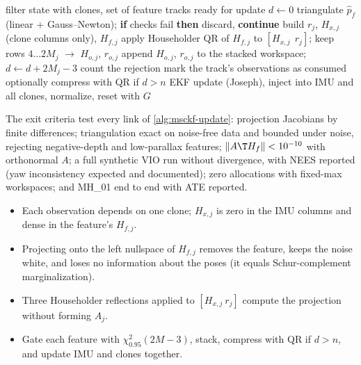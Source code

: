 \begin{algorithm}[t]
\caption{MSCKF visual update}
\label{alg:msckf-update}
\begin{algorithmic}[1]
\Require filter state with clones, set of feature tracks ready for update
\State $d \gets 0$
  \State triangulate $\hat p_f$ (linear + Gauss--Newton); \textbf{if} checks fail \textbf{then} discard, \textbf{continue}
  \State build $r_j$, $H_{x,j}$ (clone columns only), $H_{f,j}$
  \State apply Householder QR of $H_{f,j}$ to $[H_{x,j}\ \ r_j]$; keep rows $4\dots2M_j$ $\to$ $H_{o,j}$, $r_{o,j}$
    \State append $H_{o,j}$, $r_{o,j}$ to the stacked workspace; $d \gets d + 2M_j - 3$
  \Else \State count the rejection \EndIf
  \State mark the track's observations as consumed
\EndFor
{}
  \State optionally compress with QR if $d > n$
  \State EKF update (Joseph), inject into IMU and all clones, normalize, reset with $G$
\EndIf
\end{algorithmic}
\end{algorithm}

\begin{projectlink}[Milestone 10b]
The exit criteria test every link of \cref{alg:msckf-update}: projection Jacobians by finite differences; triangulation exact on
noise-free data and bounded under noise, rejecting negative-depth and low-parallax features; $\|A\T H_f\| < 10^{-10}$ with
orthonormal $A$; a full synthetic VIO run without divergence, with NEES reported (yaw inconsistency expected and documented);
zero allocations with fixed-max workspaces; and MH\_01 end to end with ATE reported.
\end{projectlink}

\begin{takeaways}
\begin{itemize}
  \item Each observation depends on one clone; $H_{x,j}$ is zero in the IMU columns and dense in the feature's $H_{f,j}$.
  \item Projecting onto the left nullspace of $H_{f,j}$ removes the feature, keeps the noise white, and loses no information about
        the poses (it equals Schur-complement marginalization).
  \item Three Householder reflections applied to $[H_{x,j}\ r_j]$ compute the projection without forming $A_j$.
  \item Gate each feature with $\chi^2_{0.95}(2M - 3)$, stack, compress with QR if $d > n$, and update IMU and clones together.
\end{itemize}
\end{takeaways}

